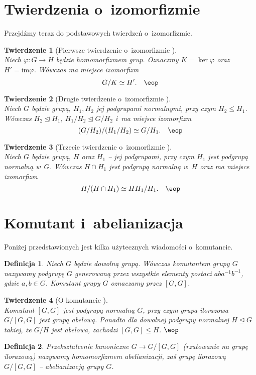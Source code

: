 \documentclass[licencjacka]{pracamgr}
\newtheorem{deff}{Definicja}[section]
\newtheorem{thh}{Twierdzenie}[section]
\begin{document}
\section{Twierdzenia o~izomorfizmie}
Przejdźmy teraz do podstawowych twierdzeń o~izomorfizmie.
\begin{thh}[{Pierwsze twierdzenie o~izomorfizmie \cite[tw. II.4.5.]{BB}}] $ $ \\
    Niech $ \varphi \colon G \to H$ będzie homomorfizmem grup. Oznaczmy $K = \ker{\varphi}$ oraz
    $H' = \mathrm{im}\varphi $. 
    Wówczas ma miejsce izomorfizm $$G/K \simeq H'.\quad\eop$$
\end{thh}
\begin{thh}[{Drugie twierdzenie o~izomorfizmie \cite[tw. II.4.6. a)]{BB}}]$ $\\
    Niech $G$ będzie grupą,  $H_1, H_2$ jej podgrupami normalnymi,
    przy czym $H_2 \leq H_1$. 
    Wówczas $H_2 \trianglelefteq H_1$, $H_1/H_2 \trianglelefteq G/H_2$ i~ma miejsce izomorfizm
    $$ (G/H_2) / (H_1/H_2) \simeq G/H_1.\quad\eop$$
\end{thh}
\begin{thh}[{Trzecie twierdzenie o~izomorfizmie \cite[tw. II.4.6. b)]{BB}}] $ $ \\
    Niech $G$ będzie grupą, $H$ oraz $H_1$
    -- jej podgrupami, przy czym $H_1$ jest podgrupą normalną w~$G$. 
    Wówczas $H\cap H_1$ jest podgrupą normalną w~$H$ oraz ma miejsce izomorfizm
    $$ H/(H\cap H_1) \simeq HH_1 / H_1.\quad\eop$$
\end{thh}


\section{Komutant i~abelianizacja}
Poniżej przedstawionych jest kilka użytecznych wiadomości
o~komutancie.
\begin{deff}
    Niech $G$ będzie dowolną grupą. Wówczas \emph{komutantem grupy $G$} nazywamy podgrupę $G$ generowaną przez wszystkie elementy postaci
    $aba^{-1}b^{-1}$, gdzie $a, b \in G$. Komutant grupy $G$ oznaczamy przez $[G, G]$.
\end{deff}
\begin{thh}[{O komutancie \cite[tw. II.7.2-5.]{BB}}] $ $\\
    Komutant $[G,G]$ jest podgrupą normalną $G$, przy czym grupa ilorazowa $G/[G,G]$ jest grupą abelową.
    Ponadto dla dowolnej podgrupy normalnej $H \trianglelefteq G$ takiej, że $G/H$ jest abelowa, zachodzi $[G,G] \le H$.
    \quad$\eop$
\end{thh}
\begin{deff}
    Przekształcenie kanoniczne $G \to G/[G,G]$ (rzutowanie na grupę ilorazową) nazywamy
    homomorfizmem abelianizacji, zaś grupę ilorazową $G/[G,G]$ -- abelianizacją grupy $G$.
\end{deff}
\end{document}

